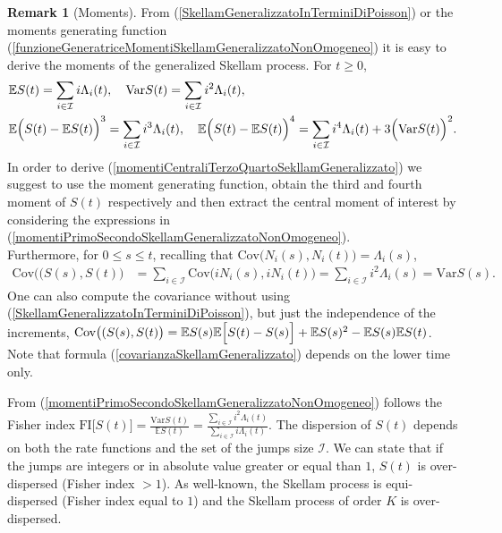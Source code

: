 \documentclass[12pt, twoside, english, headsepline]{article}
\theoremstyle{definition} %
\newtheorem{remark}{Remark}[section] %
\numberwithin{equation}{section} %
\begin{document}
\begin{remark}[Moments]\label{remarkMomentiSkellamGeneralizzato}
From (\ref{SkellamGeneralizzatoInTerminiDiPoisson}) or the moments generating function (\ref{funzioneGeneratriceMomentiSkellamGeneralizzatoNonOmogeneo}) it is easy to derive the moments of the generalized Skellam process. For $t\ge0$,
\begin{align}
&\mathbb{E}S(t) = \sum_{i\in\mathcal{I}} i \Lambda_i(t), \ \ \  \text{Var}S(t) = \sum_{i\in\mathcal{I}} i^2 \Lambda_i(t),  \label{momentiPrimoSecondoSkellamGeneralizzatoNonOmogeneo}\\ 
& \mathbb{E} \Bigl(S(t)- \mathbb{E}S(t)\Bigr)^3 = \sum_{i\in\mathcal{I}} i^3\Lambda_{i}(t),\ \ \  \mathbb{E} \Bigl(S(t)- \mathbb{E}S(t)\Bigr)^4 = \sum_{i\in\mathcal{I}} i^4\Lambda_{i}(t) + 3\Bigl(\text{Var}S(t)\Bigr)^2. \label{momentiCentraliTerzoQuartoSekllamGeneralizzato}
\end{align}
In order to derive (\ref{momentiCentraliTerzoQuartoSekllamGeneralizzato}) we suggest to use the moment generating function, obtain the third and fourth moment of $S(t)$ respectively and then extract the central moment of interest by considering the expressions in (\ref{momentiPrimoSecondoSkellamGeneralizzatoNonOmogeneo}).
 \\
Furthermore, for $0\le s \le t$, recalling that $\text{Cov}\bigl(N_i(s), N_i(t)\bigr) = \Lambda_i(s)$,
\begin{align}
\text{Cov}\bigl((S(s),S(t)\bigr) & =\sum_{i\in\mathcal{I}} \text{Cov}\bigl(iN_i(s), iN_i(t)\bigr)  = \sum_{i\in\mathcal{I}} i^2 \Lambda_i(s) =\text{Var}S(s). \label{covarianzaSkellamGeneralizzato}
\end{align}
One can also compute the covariance without using (\ref{SkellamGeneralizzatoInTerminiDiPoisson}), but just the independence of the increments, $ \text{Cov}\bigl((S(s),S(t)\bigr) = \mathbb{E}S(s)\mathbb{E}\Bigl[S(t)-S(s)\Bigr] + \mathbb{E}S(s)^2 -  \mathbb{E}S(s)\mathbb{E}S(t) $. Note that formula (\ref{covarianzaSkellamGeneralizzato})  depends on the lower time only.

From (\ref{momentiPrimoSecondoSkellamGeneralizzatoNonOmogeneo}) follows the Fisher index $\text{FI} \bigl[ S(t) \bigr] = \frac{\text{Var}S(t)}{\mathbb{E}S(t)} = \frac{\sum_{i\in\mathcal{I}} i^2 \Lambda_i(t)}{\sum_{i\in\mathcal{I}} i \Lambda_i(t)}.$ The dispersion of $S(t)$ depends on both the rate functions and the set of the jumps size $\mathcal{I}$. We can state that if the jumps are integers or in absolute value greater or equal than $1$, $S(t)$ is over-dispersed (Fisher index $>1$). As well-known, the Skellam process is equi-dispersed (Fisher index equal to $1$) and the Skellam process of order $K$ is over-dispersed.


\end{remark}
\end{document}

